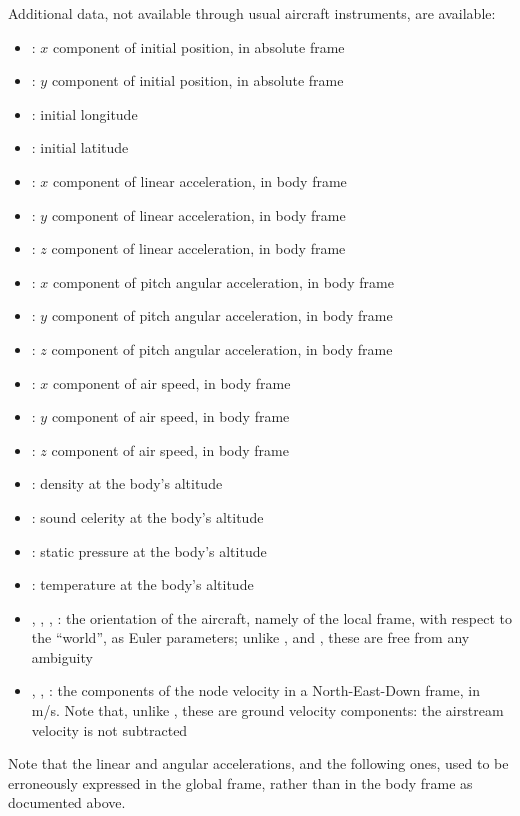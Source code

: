 Additional data, not available through usual aircraft instruments, are available:
\begin{itemize}
\item {}: $x$ component of initial position, in absolute frame
\item {}: $y$ component of initial position, in absolute frame
\item {}: initial longitude
\item {}: initial latitude
\item {}: $x$ component of linear acceleration, in body frame
\item {}: $y$ component of linear acceleration, in body frame
\item {}: $z$ component of linear acceleration, in body frame
\item {}: $x$ component of pitch angular acceleration, in body frame
\item {}: $y$ component of pitch angular acceleration, in body frame
\item {}: $z$ component of pitch angular acceleration, in body frame
\item {}: $x$ component of air speed, in body frame
\item {}: $y$ component of air speed, in body frame
\item {}: $z$ component of air speed, in body frame
\item {}: density at the body's altitude
\item {}: sound celerity at the body's altitude
\item {}: static pressure at the body's altitude
\item {}: temperature at the body's altitude
\item {}, , , : the orientation of the
  aircraft, namely of the local frame, with respect to the ``world'',
  as Euler parameters; unlike ,  and
  , these are free from any ambiguity
\item {}, , : the components of the node
  velocity in a North-East-Down frame, in m/s.
  Note that, unlike , these are ground velocity
  components: the airstream velocity is not subtracted
\end{itemize}
Note that the linear and angular accelerations,  and the
following ones, used to be erroneously expressed in the global frame,
rather than in the body frame as documented above.

